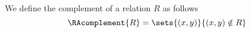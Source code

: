 \begin{definition}
\label{def:complement}
	We define the complement of a relation $R$ as follows
	\begin{equation*}
		\RAcomplement{R} = \sets{(x,y)}{(x,y) \notin R}
	\end{equation*}
\end{definition}